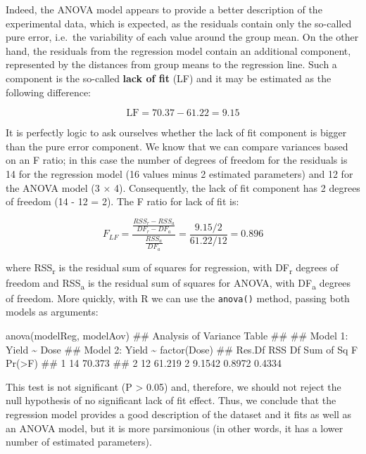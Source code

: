 \documentclass[a4paper,12pt,oneside]{book}
\newenvironment{Shaded}{\begin{snugshade}}{\end{snugshade}}
\newcommand{\DocumentationTok}[1]{#1}
\newcommand{\FunctionTok}[1]{#1}
\newcommand{\NormalTok}[1]{#1}
\begin{document}
Indeed, the ANOVA model appears to provide a better description of the experimental data, which is expected, as the residuals contain only the so-called pure error, i.e.~the variability of each value around the group mean. On the other hand, the residuals from the regression model contain an additional component, represented by the distances from group means to the regression line. Such a component is the so-called \textbf{lack of fit} (LF) and it may be estimated as the following difference:

\[\textrm{LF} = 70.37 - 61.22 = 9.15\]

It is perfectly logic to ask ourselves whether the lack of fit component is bigger than the pure error component. We know that we can compare variances based on an F ratio; in this case the number of degrees of freedom for the residuals is 14 for the regression model (16 values minus 2 estimated parameters) and 12 for the ANOVA model (3 \(\times\) 4). Consequently, the lack of fit component has 2 degrees of freedom (14 - 12 = 2). The F ratio for lack of fit is:

\[F_{LF} = \frac{ \frac{RSS_r - RSS_a}{DF_r - DF_a} } {\frac{RSS_a}{DF_a}} = \frac{9.15 / 2}{61.22/12} = 0.896\]

where RSS\textsubscript{r} is the residual sum of squares for regression, with DF\textsubscript{r} degrees of freedom and RSS\textsubscript{a} is the residual sum of squares for ANOVA, with DF\textsubscript{a} degrees of freedom. More quickly, with R we can use the \texttt{anova()} method, passing both models as arguments:

\begin{Shaded}
\begin{Highlighting}[]
\FunctionTok{anova}\NormalTok{(modelReg, modelAov)}
\DocumentationTok{\#\# Analysis of Variance Table}
\DocumentationTok{\#\# }
\DocumentationTok{\#\# Model 1: Yield \textasciitilde{} Dose}
\DocumentationTok{\#\# Model 2: Yield \textasciitilde{} factor(Dose)}
\DocumentationTok{\#\#   Res.Df    RSS Df Sum of Sq      F Pr(\textgreater{}F)}
\DocumentationTok{\#\# 1     14 70.373                           }
\DocumentationTok{\#\# 2     12 61.219  2    9.1542 0.8972 0.4334}
\end{Highlighting}
\end{Shaded}

This test is not significant (P \textgreater{} 0.05) and, therefore, we should not reject the null hypothesis of no significant lack of fit effect. Thus, we conclude that the regression model provides a good description of the dataset and it fits as well as an ANOVA model, but it is more parsimonious (in other words, it has a lower number of estimated parameters).
\end{document}
